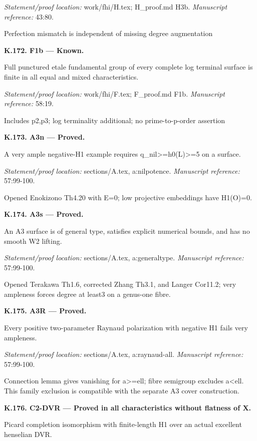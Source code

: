 \par\emph{Statement/proof location:} work/fhi/H.tex; H\_proof.md H3b.
\emph{Manuscript reference:} 43:80.
\par Perfection mismatch is independent of missing degree augmentation
\par\medskip\noindent\textbf{K.172. F1b --- Known.}\par
Full punctured etale fundamental group of every complete log terminal surface is finite in all equal and mixed characteristics.
\par\emph{Statement/proof location:} work/fhi/F.tex; F\_proof.md F1b.
\emph{Manuscript reference:} 58:19.
\par Includes p2,p3; log terminality additional; no prime-to-p-order assertion
\par\medskip\noindent\textbf{K.173. A3n --- Proved.}\par
A very ample negative-H1 example requires q\_nil>=h0(L)>=5 on a surface.
\par\emph{Statement/proof location:} sections/A.tex, a:nilpotence.
\emph{Manuscript reference:} 57:99-100.
\par Opened Enokizono Th4.20 with E=0; low projective embeddings have H1(O)=0.
\par\medskip\noindent\textbf{K.174. A3s --- Proved.}\par
An A3 surface is of general type, satisfies explicit numerical bounds, and has no smooth W2 lifting.
\par\emph{Statement/proof location:} sections/A.tex, a:generaltype.
\emph{Manuscript reference:} 57:99-100.
\par Opened Terakawa Th1.6, corrected Zhang Th3.1, and Langer Cor11.2; very ampleness forces degree at least3 on a genus-one fibre.
\par\medskip\noindent\textbf{K.175. A3R --- Proved.}\par
Every positive two-parameter Raynaud polarization with negative H1 fails very ampleness.
\par\emph{Statement/proof location:} sections/A.tex, a:raynaud-all.
\emph{Manuscript reference:} 57:99-100.
\par Connection lemma gives vanishing for a>=ell; fibre semigroup excludes a<ell. This family exclusion is compatible with the separate A3 cover construction.
\par\medskip\noindent\textbf{K.176. C2-DVR --- Proved in all characteristics without flatness of X.}\par
Picard completion isomorphism with finite-length H1 over an actual excellent henselian DVR.
